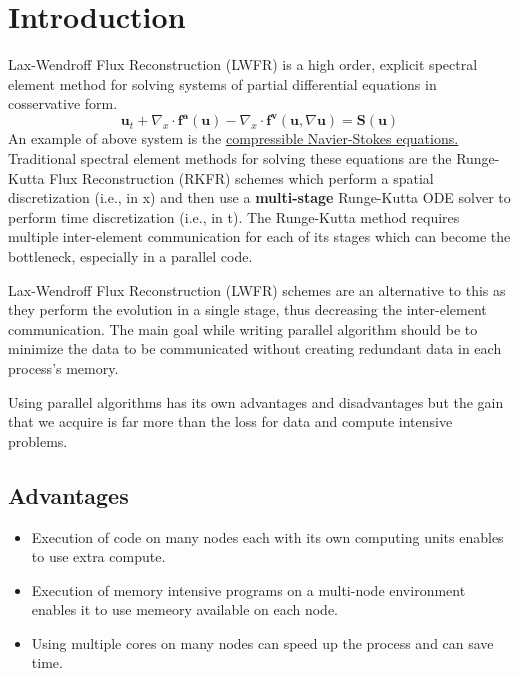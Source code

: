 \section{Introduction}
Lax-Wendroff Flux Reconstruction (LWFR) is a high order, explicit spectral element method for solving systems of partial differential equations in cosservative form. 
\begin{equation}
    \boldsymbol{u}_t + \nabla_x \cdot \boldsymbol{f^a(u)} - \nabla_x \cdot \boldsymbol{f^v}(\boldsymbol{u},\nabla \boldsymbol{u}) = \boldsymbol{S(u)}
\end{equation}
An example of above system is the \href{https://en.wikipedia.org/wiki/Navier%E2%80%93Stokes_equations}{compressible Navier-Stokes equations.} Traditional spectral element methods for solving these equations are the Runge-Kutta Flux Reconstruction (RKFR) schemes which perform a spatial discretization (i.e., in x) and then use a \textbf{multi-stage} Runge-Kutta ODE solver to perform time discretization (i.e., in t). The Runge-Kutta method requires multiple inter-element communication for each of its stages which can become the bottleneck, especially in a parallel code.  

Lax-Wendroff Flux Reconstruction (LWFR) schemes are an alternative to this as they perform the evolution in a single stage, thus decreasing the inter-element communication. The main goal while writing parallel algorithm should be to minimize the data to be communicated without creating redundant data in each process's memory. 

Using parallel algorithms has its own advantages and disadvantages but the gain that we acquire is far more than the loss for data and compute intensive problems.
\subsection{Advantages}
\begin{itemize}
    \item Execution of code on many nodes each with its own computing units enables to use extra compute.
    \item Execution of memory intensive programs on a multi-node environment enables it to use memeory available on each node.
    \item Using multiple cores on many nodes can speed up the process and can save time.
\end{itemize}

